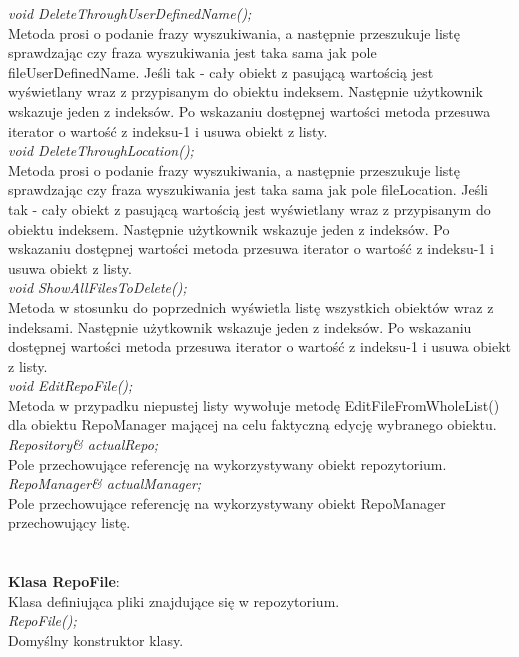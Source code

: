 \documentclass[10pt, a4paper]{article}
\begin{document}
\textit{void DeleteThroughUserDefinedName();}\\
Metoda prosi o podanie frazy wyszukiwania, a następnie przeszukuje listę sprawdzając czy fraza wyszukiwania jest taka sama jak pole fileUserDefinedName. Jeśli tak - cały obiekt z pasującą wartością jest wyświetlany wraz z przypisanym do obiektu indeksem. Następnie użytkownik wskazuje jeden z indeksów. Po wskazaniu dostępnej wartości metoda przesuwa iterator o wartość z indeksu-1 i usuwa obiekt z listy.\\

\textit{void DeleteThroughLocation();}\\
Metoda prosi o podanie frazy wyszukiwania, a następnie przeszukuje listę sprawdzając czy fraza wyszukiwania jest taka sama jak pole fileLocation. Jeśli tak - cały obiekt z pasującą wartością jest wyświetlany wraz z przypisanym do obiektu indeksem. Następnie użytkownik wskazuje jeden z indeksów. Po wskazaniu dostępnej wartości metoda przesuwa iterator o wartość z indeksu-1 i usuwa obiekt z listy.\\

\textit{void ShowAllFilesToDelete();}\\
Metoda w stosunku do poprzednich wyświetla listę wszystkich obiektów wraz z indeksami. Następnie użytkownik wskazuje jeden z indeksów. Po wskazaniu dostępnej wartości metoda przesuwa iterator o wartość z indeksu-1 i usuwa obiekt z listy.\\

\textit{void EditRepoFile();}\\
Metoda w przypadku niepustej listy wywołuje metodę EditFileFromWholeList() dla obiektu RepoManager mającej na celu faktyczną edycję wybranego obiektu.\\

\textit{Repository& actualRepo;}\\
Pole przechowujące referencję na wykorzystywany obiekt repozytorium.\\

\textit{RepoManager& actualManager;}\\
Pole przechowujące referencję na wykorzystywany obiekt RepoManager przechowujący listę.\\
\\\\
\textbf{Klasa RepoFile}:\\
Klasa definiująca pliki znajdujące się w repozytorium.\\

\textit{RepoFile();}\\
Domyślny konstruktor klasy.
\end{document}
